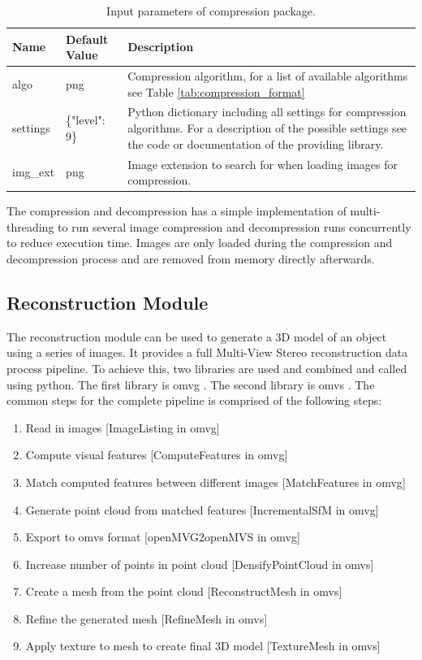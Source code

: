 \begin{table}[htpb]
    \centering
    \caption{Input parameters of compression package.}
    \label{tab:compression_settings}
    \begin{tabular}{p{}|p{}|p{}}
        \textbf{Name} & \textbf{Default Value} & \textbf{Description} \\ \hline
        algo    & png          & Compression algorithm, for a list of available algorithms see Table \ref{tab:compression_format}\\
        settings    & \{"level": 9\} & Python dictionary including all settings for compression algorithms. For a description of the possible settings see the code or documentation of the providing library. \\
        img\_ext    & png          & Image extension to search for when loading images for compression. 
    \end{tabular}
\end{table}

The compression and decompression has a simple implementation of multi-threading to run several image compression and decompression runs concurrently to reduce execution time. Images are only loaded during the compression and decompression process and are removed from memory directly afterwards.

\subsection{Reconstruction Module}
The reconstruction module can be used to generate a 3D model of an object using a series of images. It provides a full Multi-View Stereo reconstruction data process pipeline. To achieve this, two libraries are used and combined and called using python. The first library is \gls{omvg} \cite{openMVG}. The second library is \gls{omvs} \cite{openMVS}. 
The common steps for the complete pipeline is comprised of the following steps:
\begin{enumerate}
    \item Read in images [ImageListing in \gls{omvg}]
    \item Compute visual features [ComputeFeatures in \gls{omvg}]
    \item Match computed features between different images [MatchFeatures in \gls{omvg}]
    \item Generate point cloud from matched features [IncrementalSfM in \gls{omvg}]
    \item Export to \gls{omvs} format [openMVG2openMVS in \gls{omvg}]
    \item Increase number of points in point cloud [DensifyPointCloud in \gls{omvs}]
    \item Create a mesh from the point cloud [ReconstructMesh in \gls{omvs}]
    \item Refine the generated mesh [RefineMesh in \gls{omvs}]
    \item Apply texture to mesh to create final 3D model [TextureMesh in \gls{omvs}]
\end{enumerate}

